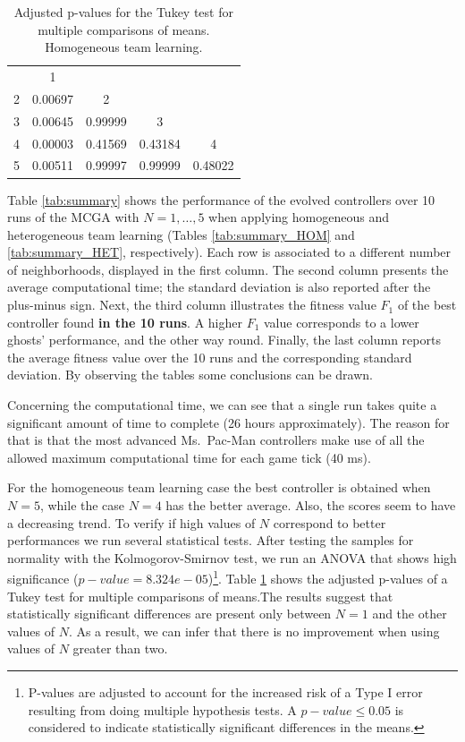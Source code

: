 \documentclass[journal]{IEEEtran}
\begin{document}
\begin{table} [!t]
\caption{Adjusted p-values for the Tukey test for multiple comparisons of means. Homogeneous team learning.}
\label{tab:tukey}
\begin{tabular}{c|c|c|cc}
\multicolumn{1}{c}{} & \multicolumn{1}{c}{1} & \multicolumn{1}{c}{} &  & \tabularnewline
\cline{2-2} 
2 & 0.00697 & \multicolumn{1}{c}{2} &  & \tabularnewline
\cline{2-3} 
3 & 0.00645 & 0.99999 & 3 & \tabularnewline
\cline{2-4} 
4 & 0.00003 & 0.41569 & \multicolumn{1}{c|}{0.43184} & 4\tabularnewline
\cline{2-5} 
5 & 0.00511 & 0.99997 & \multicolumn{1}{c|}{0.99999} & \multicolumn{1}{c|}{0.48022}\tabularnewline
\cline{2-5} 
\end{tabular}
\end{table}

Table \ref{tab:summary} shows the performance of the evolved controllers over 10 runs of the MCGA with $N=1,\ldots,5$ when applying homogeneous and heterogeneous team learning (Tables \ref{tab:summary_HOM} and \ref{tab:summary_HET}, respectively). Each row is associated to a different number of neighborhoods, displayed in the first column. The second column presents the average computational time; the standard deviation is also reported after the plus-minus sign. Next, the third column illustrates the fitness value $F_1$ of the best controller found \textbf{in the 10 runs}. A higher $F_1$ value corresponds to a lower ghosts' performance, and the other way round. Finally, the last column reports the average fitness value over the 10 runs and the corresponding standard deviation. By observing the tables some conclusions can be drawn.

Concerning the computational time, we can see that a single run takes
quite a significant amount of time to complete (26 hours
approximately). The reason for that is that the most advanced
Ms.\  Pac-Man controllers make use of all the allowed maximum
computational time for each game tick (40 ms). 

For the homogeneous team learning case the best controller is obtained
when $N=5$, while the case $N=4$ has the better average. Also, the scores seem to have a decreasing trend. To verify if high values of $N$ correspond to better performances we run several statistical tests. After testing the samples for normality with the Kolmogorov-Smirnov test, we run an ANOVA that shows high significance ($p-value=8.324e-05$)\footnote{P-values are adjusted to account for the increased risk of a Type I error resulting from doing multiple hypothesis tests. A $p-value\leq0.05$ is considered to indicate statistically significant differences in the means.}. Table \ref{tab:tukey} shows the adjusted p-values of a Tukey test for multiple comparisons of means.The results suggest that statistically significant differences are present only between $N=1$ and the other values of $N$. As a result, we can infer that there is no improvement when using values of $N$ greater than two.
\end{document}
